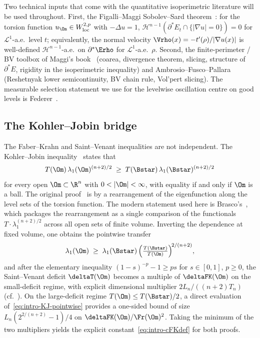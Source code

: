 Two technical inputs that come with the quantitative isoperimetric
literature will be used throughout. First, the Figalli--Maggi
Sobolev--Sard theorem~\cite[App.~A, Thm~A.1]{FigalliMaggi2011}: for
the torsion function $u_\Om\in W^{2,p}_{\rm loc}$ with $-\Delta u=1$,
$\mathcal H^{n-1}(\partial^*E_t\cap\{|\nabla u|=0\})=0$ for
$\mathcal L^1$-a.e.\ level $t$; equivalently, the normal velocity
$\Vrho(x)=-t'(\rho)/|\nabla u(x)|$ is well-defined
$\mathcal H^{n-1}$-a.e.\ on $\partial^*\Erho$ for $\mathcal
L^1$-a.e.\ $\rho$. Second, the finite-perimeter / BV toolbox of
Maggi's book~\cite{Maggi2012} (coarea, divergence theorem,
slicing, structure of $\partial^*E$, rigidity in the isoperimetric
inequality) and Ambrosio--Fusco--Pallara~\cite{AFP2000} (Reshetnyak
lower semicontinuity, BV chain rule, Vol'pert slicing). The
measurable selection statement we use for the levelwise oscillation
centre on good levels is Federer~\cite[\S2.13]{Federer1969}.

\subsection{The Kohler--Jobin bridge}
\label{ssec:intro-kj}

The Faber--Krahn and Saint--Venant inequalities are not independent.
The Kohler--Jobin inequality~\cite{KohlerJobin1978} states that
\begin{equation}\label{eq:intro-KJ}
   T(\Om)\,\lambda_1(\Om)^{(n+2)/2}
   \;\ge\;
   T(\Bstar)\,\lambda_1(\Bstar)^{(n+2)/2}
\end{equation}
for every open $\Om\subset\R^n$ with $0<|\Om|<\infty$, with equality
if and only if $\Om$ is a ball. The original
proof~\cite{KohlerJobin1978} is by a rearrangement of the eigenfunction
along the level sets of the torsion function. The modern statement
used here is Brasco's~\cite[Thm~3.3]{Brasco2014}, which packages the
rearrangement as a single comparison of the functionals
$T\cdot\lambda_1^{(n+2)/2}$ across all open sets of finite
volume. Inverting the dependence at fixed volume, one obtains the
pointwise transfer
\begin{equation}\label{eq:intro-KJ-pointwise}
   \lambda_1(\Om)\;\ge\;
   \lambda_1(\Bstar)\,
   \Bigl(\tfrac{T(\Bstar)}{T(\Om)}\Bigr)^{\!2/(n+2)},
\end{equation}
and after the elementary inequality $(1-s)^{-p}-1\ge ps$ for
$s\in[0,1]$, $p\ge 0$, the Saint--Venant deficit $\deltaT(\Om)$
becomes a multiple of $\deltaFK(\Om)$ on the small-deficit regime,
with explicit dimensional multiplier $2L_n/((n+2)T_n)$
(cf.~\cite[\S3]{Brasco2014}). On the large-deficit regime
$T(\Om)\le T(\Bstar)/2$, a direct evaluation
of~\eqref{eq:intro-KJ-pointwise} provides a one-sided bound of size
$L_n(2^{2/(n+2)}-1)/4$ on $\deltaFK(\Om)/\Fr(\Om)^2$. Taking the
minimum of the two multipliers yields the explicit
constant~\eqref{eq:intro-cFKdef} for both proofs.

